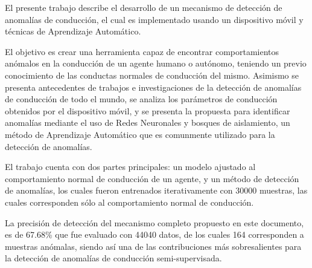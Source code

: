 El presente trabajo describe el desarrollo de un mecanismo de detecci\'{o}n de anomal\'{i}as de conducci\'{o}n, el cual es implementado usando un dispositivo m\'{o}vil y t\'{e}cnicas de Aprendizaje Autom\'{a}tico. 

El objetivo es crear una herramienta capaz de encontrar comportamientos an\'{o}malos en la conducci\'{o}n de un agente humano o aut\'{o}nomo, teniendo un previo conocimiento de las conductas normales de conducci\'{o}n del mismo. Asimismo se presenta antecedentes de trabajos e investigaciones de la detecci\'{o}n de anomal\'{i}as de conducci\'{o}n de todo el mundo, se analiza los par\'{a}metros de conducci\'{o}n obtenidos por el dispositivo m\'{o}vil, y se presenta la propuesta para identificar anomal\'{i}as mediante el uso de Redes Neuronales y bosques de aislamiento, un m\'{e}todo de Aprendizaje Autom\'{a}tico que es comunmente utilizado para la detecci\'{o}n de anomal\'{i}as.

El trabajo cuenta con dos partes principales: un modelo ajustado al comportamiento normal de conducci\'{o}n de un agente, y un m\'{e}todo de detecci\'{o}n de anomal\'{i}as, los cuales fueron entrenados iterativamente con 30000 muestras, las cuales corresponden s\'{o}lo al comportamiento normal de conducci\'{o}n.

La precisi\'{o}n de detecci\'{o}n del mecanismo completo propuesto en este documento, es de 67.68\% que fue evaluado con 44040 datos, de los cuales 164 corresponden a muestras an\'{o}malas, siendo as\'{i} una de las contribuciones m\'{a}s sobresalientes para la detecci\'{o}n de anomal\'{i}as de conducci\'{o}n semi-supervisada.





